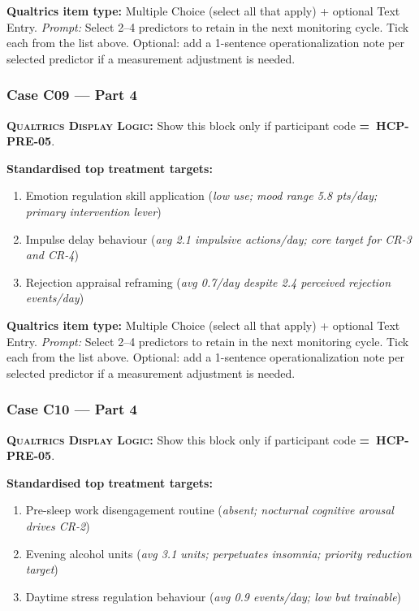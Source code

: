 \documentclass[11pt,a4paper]{article}
\newcommand{\checkboxresponse}[1]{\begin{tcolorbox}[colback=ResponseBG,colframe=GoldAmber,boxrule=0.6pt,arc=1.5mm,left=6pt,right=6pt,top=5pt,bottom=5pt]\small\textbf{\color{GoldAmber}Qualtrics item type:} Multiple Choice (select all that apply) + optional Text Entry. \quad \textit{Prompt:} #1\end{tcolorbox}}
\newcommand{\dlnote}[1]{\par\vspace{0.15em}\noindent\begin{tcolorbox}[colback=AccentAmber,colframe=GoldAmber,boxrule=0.45pt,arc=1mm,left=5pt,right=5pt,top=2.5pt,bottom=2.5pt]\footnotesize\textbf{\color{GoldAmber}\scshape Qualtrics Display Logic:} Show this block only if participant code \textbf{=~#1}.\end{tcolorbox}\vspace{0.1em}}
\begin{document}
\checkboxresponse{Select 2--4 predictors to retain in the next monitoring cycle. Tick each from the list above. Optional: add a 1-sentence operationalization note per selected predictor if a measurement adjustment is needed.}

\vspace{0.4em}

\subsubsection*{Case C09 --- Part 4}
\dlnote{HCP-PRE-05}

\begin{contextbox}
\small\textbf{Standardised top treatment targets:}
\begin{enumerate}[topsep=2pt,itemsep=1pt,label=\arabic*.]
\item Emotion regulation skill application (\textit{low use; mood range 5.8 pts/day; primary intervention lever})
\item Impulse delay behaviour (\textit{avg 2.1 impulsive actions/day; core target for CR-3 and CR-4})
\item Rejection appraisal reframing (\textit{avg 0.7/day despite 2.4 perceived rejection events/day})
\end{enumerate}
\end{contextbox}

\checkboxresponse{Select 2--4 predictors to retain in the next monitoring cycle. Tick each from the list above. Optional: add a 1-sentence operationalization note per selected predictor if a measurement adjustment is needed.}

\vspace{0.4em}

\subsubsection*{Case C10 --- Part 4}
\dlnote{HCP-PRE-05}

\begin{contextbox}
\small\textbf{Standardised top treatment targets:}
\begin{enumerate}[topsep=2pt,itemsep=1pt,label=\arabic*.]
\item Pre-sleep work disengagement routine (\textit{absent; nocturnal cognitive arousal drives CR-2})
\item Evening alcohol units (\textit{avg 3.1 units; perpetuates insomnia; priority reduction target})
\item Daytime stress regulation behaviour (\textit{avg 0.9 events/day; low but trainable})
\end{enumerate}
\end{contextbox}
\end{document}
